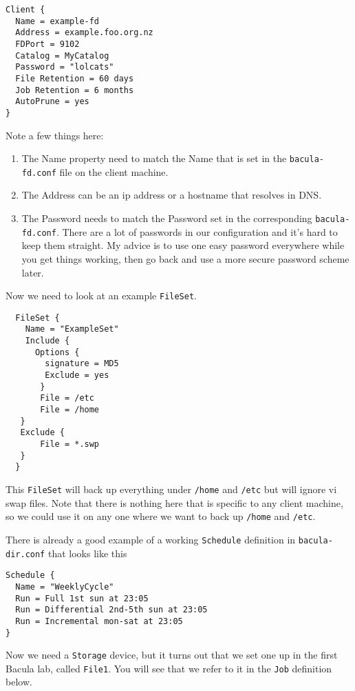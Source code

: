 \documentclass{article}   	%
\begin{document}
\begin{verbatim}
Client {
  Name = example-fd
  Address = example.foo.org.nz
  FDPort = 9102
  Catalog = MyCatalog
  Password = "lolcats"          
  File Retention = 60 days            
  Job Retention = 6 months            
  AutoPrune = yes                     
}
\end{verbatim}

Note a few things here:
\begin{enumerate}
  \item The Name property need to match the Name that is set in the \texttt{bacula-fd.conf} file on the client machine.
  \item The Address can be an ip address or a hostname that resolves in DNS.
  \item The Password needs to match the Password set in the corresponding \texttt{bacula-fd.conf}. There are a lot of passwords
  in our configuration and it's hard to keep them straight. My advice is to use one easy password everywhere while you get things working,
  then go back and use a more secure password scheme later.
\end{enumerate}
 
\newpage

Now we need to look at an example \texttt{FileSet}.
  
  \begin{verbatim}
  FileSet {
    Name = "ExampleSet"
    Include {
      Options {
        signature = MD5
        Exclude = yes
       }
       File = /etc
       File = /home
   }
   Exclude {
       File = *.swp
   }
  }
  \end{verbatim}
  
This \texttt{FileSet} will back up everything under \texttt{/home} and \texttt{/etc} but will ignore vi swap files. Note that there is nothing 
here that is specific to any client machine, so we could use it on any one where we want to back up \texttt{/home} and \texttt{/etc}.
 
There is already a good example of a working \texttt{Schedule} definition in \texttt{bacula-dir.conf} that looks like this

\begin{verbatim}
Schedule {
  Name = "WeeklyCycle"
  Run = Full 1st sun at 23:05
  Run = Differential 2nd-5th sun at 23:05
  Run = Incremental mon-sat at 23:05
}
\end{verbatim}

Now we need a \texttt{Storage} device, but it turns out that we set one up in the first Bacula lab, called \texttt{File1}.
You will see that we refer to it in the \texttt{Job} definition below.
\end{document}
